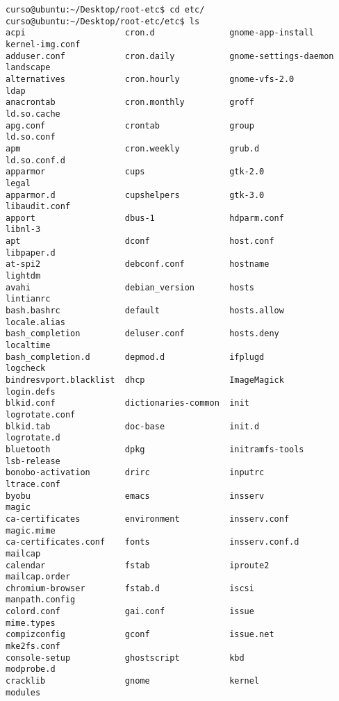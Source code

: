 \documentclass[a4paper,11pt,spanish]{article} %
\newenvironment{myscriptlisting}
{\begin{list}{}{\setlength{\leftmargin}{1em}}\item\scriptsize\bfseries}
{\end{list}}
\begin{document}
\begin{myscriptlisting}
\begin{verbatim}
curso@ubuntu:~/Desktop/root-etc$ cd etc/
curso@ubuntu:~/Desktop/root-etc/etc$ ls
acpi                    cron.d               gnome-app-install      kernel-img.conf  
adduser.conf            cron.daily           gnome-settings-daemon  landscape        
alternatives            cron.hourly          gnome-vfs-2.0          ldap             
anacrontab              cron.monthly         groff                  ld.so.cache      
apg.conf                crontab              group                  ld.so.conf       
apm                     cron.weekly          grub.d                 ld.so.conf.d     
apparmor                cups                 gtk-2.0                legal            
apparmor.d              cupshelpers          gtk-3.0                libaudit.conf    
apport                  dbus-1               hdparm.conf            libnl-3          
apt                     dconf                host.conf              libpaper.d       
at-spi2                 debconf.conf         hostname               lightdm          
avahi                   debian_version       hosts                  lintianrc        
bash.bashrc             default              hosts.allow            locale.alias     
bash_completion         deluser.conf         hosts.deny             localtime        
bash_completion.d       depmod.d             ifplugd                logcheck         
bindresvport.blacklist  dhcp                 ImageMagick            login.defs       
blkid.conf              dictionaries-common  init                   logrotate.conf   
blkid.tab               doc-base             init.d                 logrotate.d      
bluetooth               dpkg                 initramfs-tools        lsb-release      
bonobo-activation       drirc                inputrc                ltrace.conf      
byobu                   emacs                insserv                magic            
ca-certificates         environment          insserv.conf           magic.mime       
ca-certificates.conf    fonts                insserv.conf.d         mailcap          
calendar                fstab                iproute2               mailcap.order    
chromium-browser        fstab.d              iscsi                  manpath.config   
colord.conf             gai.conf             issue                  mime.types       
compizconfig            gconf                issue.net              mke2fs.conf      
console-setup           ghostscript          kbd                    modprobe.d       
cracklib                gnome                kernel                 modules          
 \end{verbatim}
\end{myscriptlisting}
\end{document}
